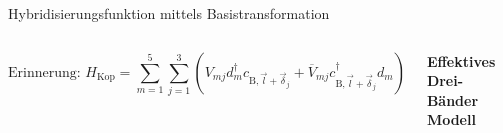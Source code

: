 \documentclass[aspectratio=1610, 9pt, xcolor=dvipsnames]{beamer}
\makeatletter
\newcommand*\widefbox[1]{\fbox{\hspace{2em}#1\hspace{2em}}}
\newcommand{\mathleft}{\@fleqntrue\@mathmargin0pt}
\newcommand{\mathcenter}{\@fleqnfalse}
\makeatother
\begin{document}
  \begin{frame}{Hybridisierungsfunktion mittels Basistransformation}
\begin{columns}
  \mathleft
    \begin{equation*}
      \text{Erinnerung: } H_\text{Kop} = \sum_{m=1}^5 \sum_{j=1}^3 \left ( V_{mj} d_m^\dagger c_{\text{B},\vec{l}+\vec{\delta}_j} + \overline{V}_{mj} c_{\text{B},\vec{l}+\vec{\delta}_j}^\dagger d_m \right )
    \end{equation*}
    \mathcenter
    \vspace*{1cm}
\begin{center}
 \color{tugreen} \huge \textbf{Effektives Drei-Bänder Modell} 
\end{center}
\hspace{-0.7cm}
\includegraphics[width=\textwidth]{Plots/3band.pdf}

\end{columns}
\end{frame}
\end{document}
